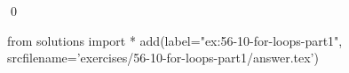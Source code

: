 
\begin{ex}
  \label{ex:56-10-for-loops-part1}
  
  \qed
\end{ex}
\begin{python0}
from solutions import *
add(label="ex:56-10-for-loops-part1",
    srcfilename='exercises/56-10-for-loops-part1/answer.tex')
\end{python0}

